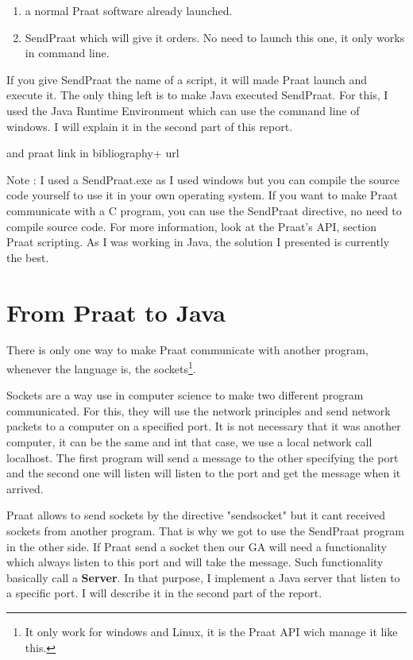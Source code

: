 \documentclass[12pt]{report}
\begin{document}
\begin{enumerate}
\item a normal Praat software already launched.
\item SendPraat which will give it orders. No need to launch this one, it only works in command line.
\end{enumerate}

If you give SendPraat the name of a script, it will made Praat launch and execute it. The only thing left is to make Java executed SendPraat. For this, I used the Java Runtime Environment which can use the command line of windows. I will explain it in the second part of this report.

 and praat link in bibliography+ url

Note : I used a SendPraat.exe as I used windows but you can compile the source code yourself to use it in your own operating system. If you want to make Praat communicate with a C program, you can use the SendPraat directive, no need to compile source code. For more information, look at the Praat's API, section Praat scripting. As I was working in Java, the solution I presented is currently the best.

\section{From Praat to Java}
There is only one way to make Praat communicate with another program, whenever the language is, the sockets\footnote{It only work for windows and Linux, it is the Praat API wich manage it like this.}. 

Sockets are a way use in computer science to make two different program communicated. For this, they will use the network principles and send network packets to a computer on a specified port. It is not necessary that it was another computer, it can be the same and int that case, we use a local network call localhost. The first program will send a message to the other specifying the port and the second one will listen will listen to the port and get the message when it arrived.

Praat allows to send sockets by the directive "sendsocket" but it cant received sockets from another program. That is why we got to use the SendPraat program in the other side.
If Praat send a socket then our GA will need a functionality which always listen to this port and  will take the message. Such functionality basically call a {\bfseries Server}.
In that purpose, I implement a Java server that listen to a specific port. I will describe it in the second part of the report.
\end{document}
